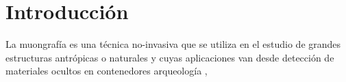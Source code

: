 \chapter{Introducción}

La muongrafía es una técnica no-invasiva que se utiliza en el estudio de grandes estructuras antrópicas o naturales y cuyas aplicaciones van desde detección de materiales ocultos en contenedores arqueología , 
